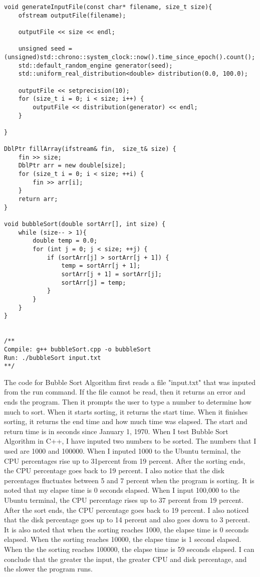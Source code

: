 \documentclass{article}
\begin{document}
\begin{lstlisting}
void generateInputFile(const char* filename, size_t size){
    ofstream outputFile(filename);

    outputFile << size << endl;

    unsigned seed = (unsigned)std::chrono::system_clock::now().time_since_epoch().count();
    std::default_random_engine generator(seed);
    std::uniform_real_distribution<double> distribution(0.0, 100.0);

    outputFile << setprecision(10);
    for (size_t i = 0; i < size; i++) {
        outputFile << distribution(generator) << endl;
    }

}

DblPtr fillArray(ifstream& fin,  size_t& size) {
    fin >> size;
    DblPtr arr = new double[size];
    for (size_t i = 0; i < size; ++i) {
        fin >> arr[i];
    }
    return arr;
}

void bubbleSort(double sortArr[], int size) {
    while (size-- > 1){
        double temp = 0.0;
        for (int j = 0; j < size; ++j) {
            if (sortArr[j] > sortArr[j + 1]) {
                temp = sortArr[j + 1];
                sortArr[j + 1] = sortArr[j];
                sortArr[j] = temp;
            }
        }
    }
}


/**
Compile: g++ bubbleSort.cpp -o bubbleSort
Run: ./bubbleSort input.txt
**/
\end{lstlisting}
The code for Bubble Sort Algorithm first reads a file "input.txt" that was inputed from the run command. If the file cannot be read, then it returns an error and ends the program. Then it prompts the user to type a number to determine how much to sort. When it starts sorting, it returns the start time. When it finishes sorting, it returns the end time and how much time was elapsed. The start and return time is in seconds since January 1, 1970. 
\newline \newline When I test Bubble Sort Algorithm in C++, I have inputed two numbers to be sorted. The numbers that I used are 1000 and 100000. When I inputed 1000 to the Ubuntu terminal, the CPU percentages rise up to 31percent from 19 percent. After the sorting ends, the CPU percentage goes back to 19 percent. I also notice that the disk percentages fluctuates between 5 and 7 percent when the program is sorting. It is noted that my elapse time is 0 seconds elapsed. When I input 100,000 to the Ubuntu terminal, the CPU percentage rises up to 37 percent from 19 percent. After the sort ends, the CPU percentage goes back to 19 percent. I also noticed that the disk percentage goes up to 14 percent and also goes down to 3 percent. It is also noted that when the sorting reaches 1000, the elapse time is 0 seconds elapsed. When the sorting reaches 10000, the elapse time is 1 second elapsed. When the the sorting reaches 100000, the elapse time is 59 seconds elapsed. I can conclude that the greater the input, the greater CPU and disk percentage, and the slower the program runs. 
\end{document}
